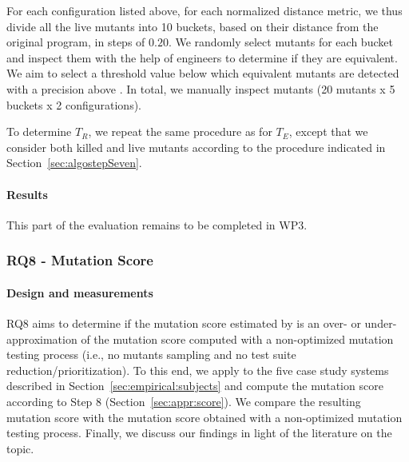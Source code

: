For each configuration listed above, for each normalized distance metric, we thus divide all the live mutants into 10 buckets, based on their distance from the original program, in steps of $0.20$.
We randomly select  mutants for each bucket and inspect them with the help of engineers to determine if they are equivalent. 
We aim to select a threshold value below which equivalent mutants are detected with a precision above . 
In total, we manually inspect  mutants (20 mutants x 5 buckets x 2 configurations).

To determine $T_R$, we repeat the same procedure as for $T_E$, except that we consider both killed and live mutants according to the procedure indicated in Section~\ref{sec:algostepSeven}.

\paragraph{Results}

This part of the evaluation remains to be completed in WP3.
%
%


\subsubsection{RQ8 - \APPR Mutation Score}

\paragraph{Design and measurements}


RQ8 aims to determine if the mutation score estimated by \APPR is an over- or under- approximation of the mutation score computed with a  non-optimized mutation testing process (i.e., no mutants sampling and no test suite reduction/prioritization). 
To this end, we apply \APPR to the five case study systems described in Section~\ref{sec:empirical:subjects} and compute the mutation score according to \APPR Step 8 (Section~\ref{sec:appr:score}).
 We compare the resulting mutation score with the mutation score obtained with a non-optimized mutation testing process.
Finally, we discuss our findings in light of the literature on the topic.

